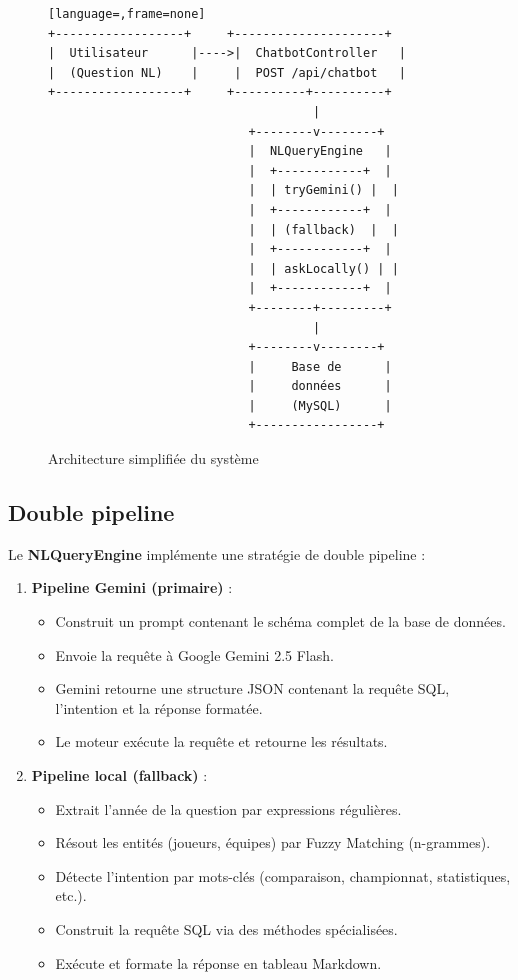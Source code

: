 \documentclass[12pt,a4paper]{report}
\begin{document}
\begin{figure}[h]
\centering
\begin{lstlisting}[language=,frame=none]
+------------------+     +---------------------+
|  Utilisateur      |---->|  ChatbotController   |
|  (Question NL)    |     |  POST /api/chatbot   |
+------------------+     +----------+----------+
                                     |
                            +--------v--------+
                            |  NLQueryEngine   |
                            |  +------------+  |
                            |  | tryGemini() |  |
                            |  +------------+  |
                            |  | (fallback)  |  |
                            |  +------------+  |
                            |  | askLocally() | |
                            |  +------------+  |
                            +--------+---------+
                                     |
                            +--------v--------+
                            |     Base de      |
                            |     données      |
                            |     (MySQL)      |
                            +-----------------+
\end{lstlisting}
\caption{Architecture simplifiée du système}
\end{figure}

\subsection{Double pipeline}

Le \textbf{NLQueryEngine} implémente une stratégie de double pipeline :

\begin{enumerate}
    \item \textbf{Pipeline Gemini (primaire)} :
    \begin{itemize}
        \item Construit un prompt contenant le schéma complet de la base de données.
        \item Envoie la requête à Google Gemini 2.5 Flash.
        \item Gemini retourne une structure JSON contenant la requête SQL, l'intention et la réponse formatée.
        \item Le moteur exécute la requête et retourne les résultats.
    \end{itemize}
    \item \textbf{Pipeline local (fallback)} :
    \begin{itemize}
        \item Extrait l'année de la question par expressions régulières.
        \item Résout les entités (joueurs, équipes) par Fuzzy Matching (n-grammes).
        \item Détecte l'intention par mots-clés (comparaison, championnat, statistiques, etc.).
        \item Construit la requête SQL via des méthodes spécialisées.
        \item Exécute et formate la réponse en tableau Markdown.
    \end{itemize}
\end{enumerate}
\end{document}
